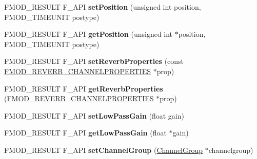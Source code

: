 \begin{DoxyCompactItemize}
\item 
F\+M\+O\+D\+\_\+\+R\+E\+S\+U\+LT F\+\_\+\+A\+PI {\bfseries set\+Position} (unsigned int position, F\+M\+O\+D\+\_\+\+T\+I\+M\+E\+U\+N\+IT postype)\hypertarget{class_f_m_o_d_1_1_channel_a46f8f6738b500bbb995bd4a4ecce826f}{}\label{class_f_m_o_d_1_1_channel_a46f8f6738b500bbb995bd4a4ecce826f}

\item 
F\+M\+O\+D\+\_\+\+R\+E\+S\+U\+LT F\+\_\+\+A\+PI {\bfseries get\+Position} (unsigned int $\ast$position, F\+M\+O\+D\+\_\+\+T\+I\+M\+E\+U\+N\+IT postype)\hypertarget{class_f_m_o_d_1_1_channel_a580cb740f80cf139faaf21181490d98f}{}\label{class_f_m_o_d_1_1_channel_a580cb740f80cf139faaf21181490d98f}

\item 
F\+M\+O\+D\+\_\+\+R\+E\+S\+U\+LT F\+\_\+\+A\+PI {\bfseries set\+Reverb\+Properties} (const \hyperlink{struct_f_m_o_d___r_e_v_e_r_b___c_h_a_n_n_e_l_p_r_o_p_e_r_t_i_e_s}{F\+M\+O\+D\+\_\+\+R\+E\+V\+E\+R\+B\+\_\+\+C\+H\+A\+N\+N\+E\+L\+P\+R\+O\+P\+E\+R\+T\+I\+ES} $\ast$prop)\hypertarget{class_f_m_o_d_1_1_channel_a1002a2ff8f7f9f33b2fce03fb472e8a8}{}\label{class_f_m_o_d_1_1_channel_a1002a2ff8f7f9f33b2fce03fb472e8a8}

\item 
F\+M\+O\+D\+\_\+\+R\+E\+S\+U\+LT F\+\_\+\+A\+PI {\bfseries get\+Reverb\+Properties} (\hyperlink{struct_f_m_o_d___r_e_v_e_r_b___c_h_a_n_n_e_l_p_r_o_p_e_r_t_i_e_s}{F\+M\+O\+D\+\_\+\+R\+E\+V\+E\+R\+B\+\_\+\+C\+H\+A\+N\+N\+E\+L\+P\+R\+O\+P\+E\+R\+T\+I\+ES} $\ast$prop)\hypertarget{class_f_m_o_d_1_1_channel_a0e0e479c81abd5e709bda6abcebac57b}{}\label{class_f_m_o_d_1_1_channel_a0e0e479c81abd5e709bda6abcebac57b}

\item 
F\+M\+O\+D\+\_\+\+R\+E\+S\+U\+LT F\+\_\+\+A\+PI {\bfseries set\+Low\+Pass\+Gain} (float gain)\hypertarget{class_f_m_o_d_1_1_channel_a10e6a2fe8768461407fac5963167c416}{}\label{class_f_m_o_d_1_1_channel_a10e6a2fe8768461407fac5963167c416}

\item 
F\+M\+O\+D\+\_\+\+R\+E\+S\+U\+LT F\+\_\+\+A\+PI {\bfseries get\+Low\+Pass\+Gain} (float $\ast$gain)\hypertarget{class_f_m_o_d_1_1_channel_a0e34960ec8bd9703fcdcfa0b85683b18}{}\label{class_f_m_o_d_1_1_channel_a0e34960ec8bd9703fcdcfa0b85683b18}

\item 
F\+M\+O\+D\+\_\+\+R\+E\+S\+U\+LT F\+\_\+\+A\+PI {\bfseries set\+Channel\+Group} (\hyperlink{class_f_m_o_d_1_1_channel_group}{Channel\+Group} $\ast$channelgroup)\hypertarget{class_f_m_o_d_1_1_channel_a570b83eb8178325a131b081a8d5ffd81}{}\label{class_f_m_o_d_1_1_channel_a570b83eb8178325a131b081a8d5ffd81}


\end{DoxyCompactItemize}
